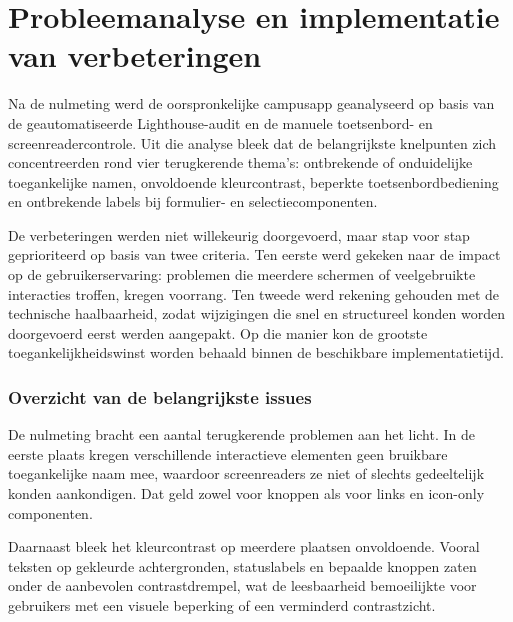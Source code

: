 \chapter{Probleemanalyse en implementatie van verbeteringen}
\label{ch:verbeteringen}


Na de nulmeting werd de oorspronkelijke campusapp geanalyseerd op basis van de geautomatiseerde Lighthouse-audit en de manuele toetsenbord- en screenreadercontrole. Uit die analyse bleek dat de belangrijkste knelpunten zich concentreerden rond vier terugkerende thema's: ontbrekende of onduidelijke toegankelijke namen, onvoldoende kleurcontrast, beperkte toetsenbordbediening en ontbrekende labels bij formulier- en selectiecomponenten.

De verbeteringen werden niet willekeurig doorgevoerd, maar stap voor stap geprioriteerd op basis van twee criteria. Ten eerste werd gekeken naar de impact op de gebruikerservaring: problemen die meerdere schermen of veelgebruikte interacties troffen, kregen voorrang. Ten tweede werd rekening gehouden met de technische haalbaarheid, zodat wijzigingen die snel en structureel konden worden doorgevoerd eerst werden aangepakt. Op die manier kon de grootste toegankelijkheidswinst worden behaald binnen de beschikbare implementatietijd.

\subsection{Overzicht van de belangrijkste issues}
\label{subsec:overzicht-belangrijkste-issues}

De nulmeting bracht een aantal terugkerende problemen aan het licht. In de eerste plaats kregen verschillende interactieve elementen geen bruikbare toegankelijke naam mee, waardoor screenreaders ze niet of slechts gedeeltelijk konden aankondigen. Dat geld zowel voor knoppen als voor links en icon-only componenten.

Daarnaast bleek het kleurcontrast op meerdere plaatsen onvoldoende. Vooral teksten op gekleurde achtergronden, statuslabels en bepaalde knoppen zaten onder de aanbevolen contrastdrempel, wat de leesbaarheid bemoeilijkte voor gebruikers met een visuele beperking of een verminderd contrastzicht.

